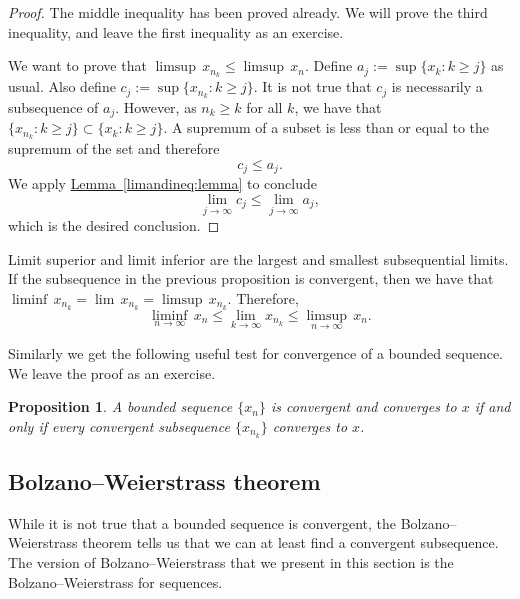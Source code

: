 \documentclass[12pt]{book}
\theoremstyle{plain}
\newtheorem{prop}[thm]{Proposition}
\theoremstyle{remark}
\theoremstyle{definition}
\theoremstyle{exercise}
\theoremstyle{example}
\newcommand{\lemmaref}[1]{\hyperref[#1]{Lemma~\ref*{#1}}}
\begin{document}
\begin{proof}
The middle inequality has been proved already.  We will prove the third
inequality, and leave the first inequality as an exercise.

We want to prove that
$\limsup \, x_{n_k} \leq \limsup \, x_n$.  Define
$a_j := \sup \{ x_k : k \geq j \}$ 
as usual.
Also define
$c_j := \sup \{ x_{n_k} : k \geq j \}$.
It is not true that $c_j$ is necessarily a subsequence of $a_j$.  However,
as $n_k \geq k$ for all $k$, we have that
$\{ x_{n_k} : k \geq j \} \subset \{ x_k : k \geq j \}$.
A supremum of a subset is less than or equal to the supremum of the
set and therefore
\begin{equation*}
c_j \leq a_j .
\end{equation*}
We apply \lemmaref{limandineq:lemma} to conclude 
\begin{equation*}
\lim_{j\to\infty} c_j \leq \lim_{j\to\infty} a_j ,
\end{equation*}
which is the desired conclusion.
\end{proof}

Limit superior and limit inferior
are the largest and smallest
subsequential limits.  If the subsequence in the previous
proposition is convergent, then we have that
$\liminf \, x_{n_k} = \lim\, x_{n_k} = \limsup \, x_{n_k}$.  Therefore,
\begin{equation*}
\liminf_{n\to\infty} \, x_n \leq
\lim_{k\to\infty} x_{n_k} \leq
\limsup_{n\to\infty} \, x_n .
\end{equation*}

Similarly we get the following useful test for convergence
of a bounded sequence.  We leave the proof as an exercise.

\begin{prop} \label{seqconvsubseqconv:prop}
A bounded sequence $\{ x_n \}$ is convergent and converges to $x$
if and only if
every convergent subsequence
$\{ x_{n_k} \}$ converges to $x$.
\end{prop}

\subsection{Bolzano--Weierstrass theorem}

While it is not true that a bounded sequence is convergent, the
Bolzano--Weierstrass theorem tells us that we can at least find a convergent
subsequence.
The version of Bolzano--Weierstrass 
that we present in this section is the Bolzano--Weierstrass for
sequences.
\end{document}
